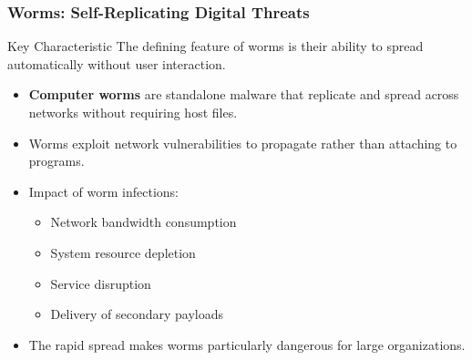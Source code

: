 \documentclass{beamer}
\begin{document}
\begin{frame}
    \frametitle{Worms: Self-Replicating Digital Threats}
    
    \begin{block}{Key Characteristic}
        The defining feature of worms is their ability to spread automatically without user interaction.
    \end{block}
    
    \begin{itemize}
        \item \textbf{Computer worms} are standalone malware that replicate and spread across networks without requiring host files.
        \item Worms exploit network vulnerabilities to propagate rather than attaching to programs.
        \item Impact of worm infections:
            \begin{itemize}
                \item Network bandwidth consumption
                \item System resource depletion
                \item Service disruption
                \item Delivery of secondary payloads
            \end{itemize}
        \item The rapid spread makes worms particularly dangerous for large organizations.
    \end{itemize}
\end{frame}
\end{document}

